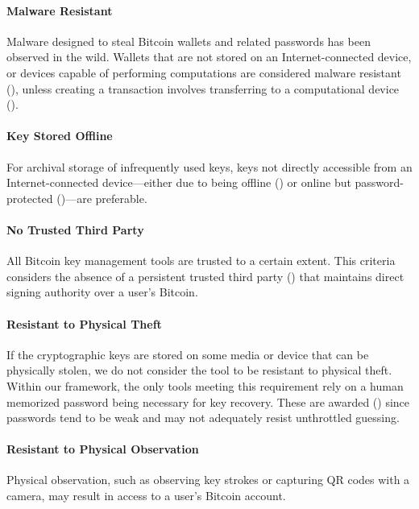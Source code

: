 \paragraph{Malware Resistant}
\label{Malware Resistant}
Malware designed to steal Bitcoin wallets and related passwords has been observed in the wild. Wallets that are not stored on an Internet-connected device, or devices capable of performing computations are considered malware resistant (\full), unless creating a transaction involves transferring to a computational device (\prt). 

\paragraph{Key Stored Offline}
\label{Key Kept Offline}
For archival storage of infrequently used keys, keys not directly accessible from an Internet-connected device---either due to being offline (\full) or online but password-protected (\prt)---are preferable. 

\paragraph{No Trusted Third Party}
\label{No Trusted Third Party}
All Bitcoin key management tools are trusted to a certain extent. 
This criteria considers the absence of a persistent trusted third party (\full) that maintains direct signing authority over a user's Bitcoin. 

\paragraph{Resistant to Physical Theft}
\label{Resistant to Physical Theft}
If the cryptographic keys are stored on some media or device that can be physically stolen, we do not consider the tool to be resistant to physical theft. Within our framework, the only tools meeting this requirement rely on a human memorized password being necessary for key recovery. These are awarded (\prt) since passwords tend to be weak and may not adequately resist unthrottled guessing. 

\paragraph{Resistant to Physical Observation}
\label{Resistant to Physical Observation}
Physical observation, such as observing key strokes or capturing QR codes with a camera, may result in access to a user's Bitcoin account. 

